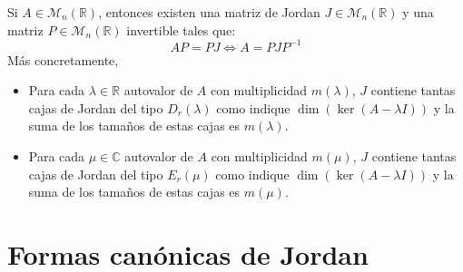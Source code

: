 \begin{theorem}
    Si $A \in \mathcal{M}_n(\mathbb{R})$, entonces existen una matriz de Jordan $J \in \mathcal{M}_n(\mathbb{R})$ y una matriz $P \in \mathcal{M}_n(\mathbb{R})$ invertible tales que:
    $$AP = PJ \Leftrightarrow A = PJP^{-1}$$
    Más concretamente,
    \begin{itemize}
        \item Para cada $\lambda \in \mathbb{R}$ autovalor de $A$ con multiplicidad $m(\lambda)$, $J$ contiene tantas cajas de Jordan del tipo $D_r(\lambda)$ como indique $\dim(\ker(A - \lambda I))$ y la suma de los tamaños de estas cajas es $m(\lambda)$.
        \item Para cada $\mu \in \mathbb{C}$ autovalor de $A$ con multiplicidad $m(\mu)$, $J$ contiene tantas cajas de Jordan del tipo $E_r(\mu)$ como indique $\dim(\ker(A - \lambda I))$ y la suma de los tamaños de estas cajas es $m(\mu)$.
    \end{itemize}
\end{theorem}

\section{Formas canónicas de Jordan}
